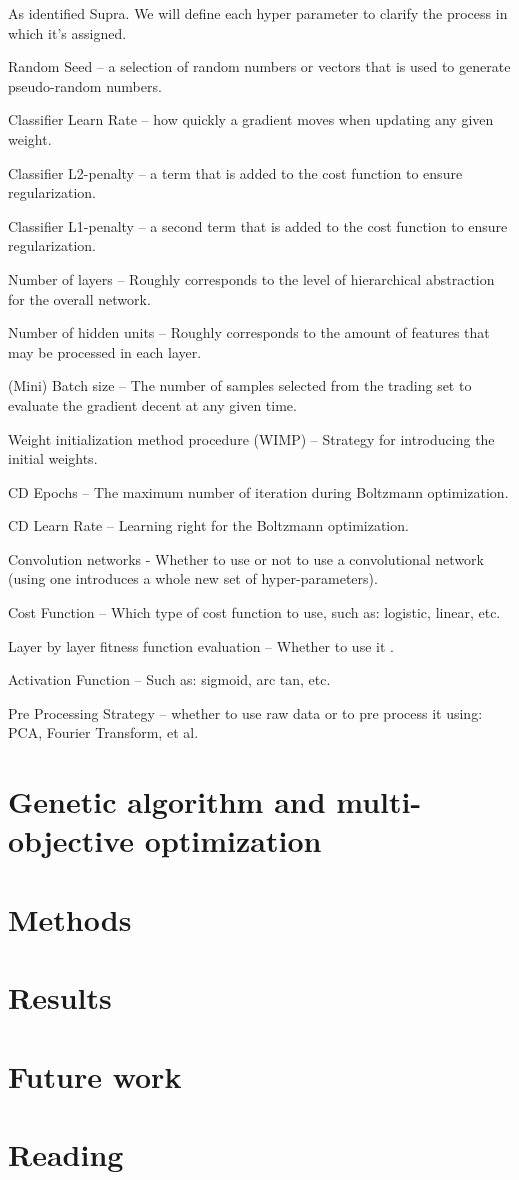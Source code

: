 \documentclass[letterpaper,11pt,reqno]{amsart}
\begin{document}
As identified Supra. We will define each hyper parameter to clarify the process in which it’s assigned. 

Random Seed –  a selection of random numbers or vectors that is used to generate pseudo-random numbers.

Classifier Learn Rate – how quickly a gradient moves when updating any given weight. 

Classifier L2-penalty –  a term that is added to the cost function to ensure regularization. 

Classifier L1-penalty –  a second term that is added to the cost function to ensure regularization. 

Number of layers – Roughly corresponds to the level of hierarchical abstraction for the overall network. 

Number of hidden units – Roughly corresponds  to the amount of features that may be processed in each layer.

(Mini) Batch size – The number of samples selected from the trading set to evaluate the gradient decent at any given time. 

Weight initialization method procedure (WIMP) – Strategy for introducing the initial weights. 

CD Epochs – The maximum number of iteration during Boltzmann optimization.

CD Learn Rate – Learning right for the Boltzmann optimization. 

Convolution networks  - Whether to use or not to use a convolutional network (using one introduces a whole new set of hyper-parameters). 

Cost Function – Which type of cost function to use, such as: logistic, linear, etc. 

Layer by layer fitness function evaluation – Whether to use it .  

Activation Function – Such as: sigmoid, arc tan, etc.

Pre Processing Strategy – whether to use raw data or to pre process it using: PCA, Fourier Transform, et al. 

\section{Genetic algorithm and multi-objective optimization}

\section{Methods}

\section{Results}

\section{Future work}

\section{Reading}
\nocite{*}


\end{document}
